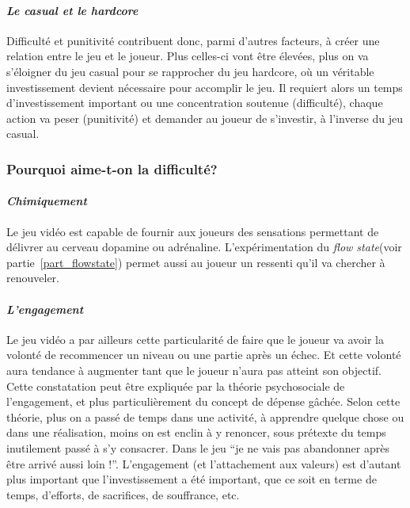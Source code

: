 		\paragraph{\emph{Le casual et le hardcore}\\ \quad}
Difficulté et punitivité contribuent donc, parmi d’autres facteurs, à créer une relation entre le jeu et le joueur. Plus celles-ci vont être élevées, plus on va s’éloigner du jeu \gls{casual} pour se rapprocher du jeu \gls{hardcore}, où un véritable investissement devient nécessaire pour accomplir le jeu. Il requiert alors un temps d’investissement important ou une concentration soutenue (difficulté), chaque action va peser (punitivité) et demander au joueur de s’investir, à l’inverse du jeu \gls{casual}.		
		
		\subsubsection{Pourquoi aime-t-on la difficulté?}
			\paragraph{\emph{Chimiquement} \\ \quad}
Le jeu vidéo est capable de fournir aux joueurs des sensations permettant de délivrer au cerveau dopamine ou adrénaline. L’expérimentation du \emph{flow state}(voir partie~\ref{part_flowstate}) permet aussi au joueur un ressenti qu’il va chercher à renouveler.

			\paragraph{\emph{L’engagement} \\ \quad}
Le jeu vidéo a par ailleurs cette particularité de faire que le joueur va avoir la volonté de recommencer un niveau ou une partie après un échec. Et cette volonté aura tendance à augmenter tant que le joueur n’aura pas atteint son objectif. Cette constatation peut être expliquée par la théorie psychosociale de l’engagement, et plus particulièrement du concept de dépense gâchée. Selon cette théorie, plus on a passé de temps dans une activité, à apprendre quelque chose ou dans une réalisation, moins on est enclin à y renoncer, sous prétexte du temps inutilement passé à s’y consacrer. Dans le jeu “je ne vais pas abandonner après être arrivé aussi loin !”. L’engagement (et l’attachement aux valeurs) est d’autant plus important que l’investissement a été important, que ce soit en terme de temps, d’efforts, de sacrifices, de souffrance, etc.

